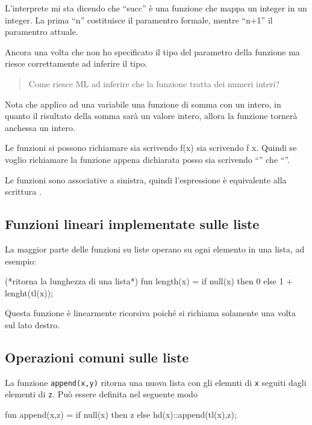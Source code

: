 \documentclass{article}
\begin{document}
L'interprete mi sta dicendo che ``succ'' è una funzione che mappa un integer in un integer.
La prima ``n'' costituisce il paramentro formale, mentre ``n+1'' il paramentro attuale.

Ancora una volta che non ho specificato il tipo del parametro della funzione ma riesce correttamente ad inferire il tipo.
\begin{quote}
Come riesce ML ad inferire che la funzione tratta dei numeri interi?
\end{quote}
Nota che applico ad una variabile una funzione di somma con un intero, in quanto il risultato della somma sarà un valore intero, allora la funzione tornerà anchessa un intero.

Le funzioni si possono richiamare sia scrivendo f(x) sia scrivendo f x.
Quindi se voglio richiamare la funzione appena dichiarata posso sia scrivendo ``'' che ``''.

Le funzioni sono associative a sinistra, quindi l'espressione  è equivalente alla scrittura .

\subsection{Funzioni lineari implementate sulle liste}

La maggior parte delle funzioni su liste operano su ogni elemento in una lista, ad esempio:
\begin{smlcode}
(*ritorna la lunghezza di una lista*)
fun length(x) = if null(x) then
					0
				else
					1 + lenght(tl(x));
\end{smlcode}
Questa funzione è linearmente ricorsiva poiché si richiama solamente una volta sul lato destro.

\subsection{Operazioni comuni sulle liste}

La funzione \texttt{append(x,y)} ritorna una nuova lista con gli elemnti di \texttt{x} seguiti dagli elementi di \texttt{z}.
Può essere definita nel seguente modo
\begin{smlcode}
fun append(x,z) = if null(x) then
					  z
				  else
				  	  hd(x)::append(tl(x),z);
\end{smlcode}
\end{document}
